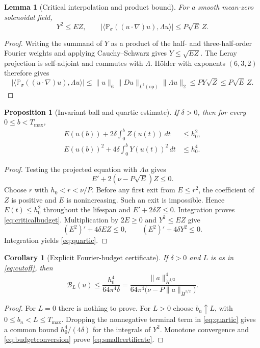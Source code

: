 \documentclass[11pt,a4paper]{article}
\numberwithin{equation}{section}
\theoremstyle{plain}
\newtheorem{proposition}[theorem]{Proposition}
\newtheorem{lemma}[theorem]{Lemma}
\newtheorem{corollary}[theorem]{Corollary}
\theoremstyle{definition}
\theoremstyle{remark}
\newcommand{\HH}[1]{\dot H^{#1}}
\newcommand{\norm}[2]{\lVert #1\rVert_{#2}}
\newcommand{\pair}[2]{\langle #1,#2\rangle}
\newcommand{\Tmax}{T_{\max}}
\newcommand{\Budget}{\mathcal B}
\newcommand{\Psol}{\mathbb P_\sigma}
\begin{document}
\begin{lemma}[Critical interpolation and product bound]\label{lem:critical}
For a smooth mean-zero solenoidal field,
\begin{equation}\label{eq:criticalbounds}
 Y^2\le EZ,\qquad
 \bigl|\pair{\Psol((u\cdot\nabla)u)}{\Lambda u}\bigr|
 \le P\sqrt E\,Z.
\end{equation}
\end{lemma}
\begin{proof}
Writing the summand of $Y$ as a product of the half- and three-half-order
Fourier weights and applying Cauchy--Schwarz gives $Y\le\sqrt{EZ}$.
The Leray projection is self-adjoint and commutes with $\Lambda$.
H\"older with exponents $(6,3,2)$ therefore gives
\[
 \bigl|\pair{\Psol((u\cdot\nabla)u)}{\Lambda u}\bigr|
 \le \norm{u}{6}\norm{Du}{L^3(\mathrm{op})}\norm{\Lambda u}{2}
 \le P Y\sqrt Z\le P\sqrt E\,Z.
\]
\end{proof}

\begin{proposition}[Invariant ball and quartic estimate]\label{prop:quartic}
If $\delta>0$, then for every $0\le b<\Tmax$,
\begin{align}
 E(u(b))+2\delta\int_0^b Z(u(t))\,dt&\le h_0^2,\label{eq:criticalbudget}\\
 E(u(b))^2+4\delta\int_0^bY(u(t))^2\,dt&\le h_0^4.\label{eq:quartic}
\end{align}
\end{proposition}
\begin{proof}
Testing the projected equation with $\Lambda u$ gives
\begin{equation}\label{eq:criticalevolution}
 E'+2(\nu-P\sqrt E)Z\le0.
\end{equation}
Choose $r$ with $h_0<r<\nu/P$. Before any first exit from $E\le r^2$,
the coefficient of $Z$ is positive and $E$ is nonincreasing. Such an exit
is impossible. Hence $E(t)\le h_0^2$ throughout the lifespan and
$E'+2\delta Z\le0$. Integration proves \eqref{eq:criticalbudget}.
Multiplication by $2E\ge0$ and $Y^2\le EZ$ give
\[
 (E^2)'+4\delta EZ\le0,
 \qquad (E^2)'+4\delta Y^2\le0.
\]
Integration yields \eqref{eq:quartic}.
\end{proof}

\begin{corollary}[Explicit Fourier-budget certificate]\label{cor:smallbudget}
If $\delta>0$ and $L$ is as in \eqref{eq:cutoff}, then
\begin{equation}\label{eq:smallcertificate}
 \boxed{\displaystyle
 \Budget_L(u)\le
 \frac{h_0^4}{64\pi^4\delta}
 =\frac{\norm{a}{\HH{1/2}}^4}
 {64\pi^4\bigl(\nu-P\norm{a}{\HH{1/2}}\bigr)}.}
\end{equation}
\end{corollary}
\begin{proof}
For $L=0$ there is nothing to prove. For $L>0$ choose $b_n\uparrow L$,
with $0\le b_n<L\le\Tmax$. Dropping the nonnegative terminal term in
\eqref{eq:quartic} gives a common bound $h_0^4/(4\delta)$ for the
integrals of $Y^2$. Monotone convergence and
\eqref{eq:budgetconversion} prove \eqref{eq:smallcertificate}.
\end{proof}
\end{document}

